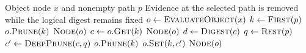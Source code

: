 \begin{algorithm}[htbp]
\caption{Deep Prune Along Object Path}
\label{alg:deep-prune}
\begin{algorithmic}[1]
\Require Object node $x$ and nonempty path $p$
\Ensure Evidence at the selected path is removed while the logical digest remains fixed
  \State $o \gets \Call{EvaluateObject}{x}$
  \State $k \gets \Call{First}{p}$
    \State $o.\Call{Prune}{k}$
    \State \Return $\Call{Node}{o}$
  \EndIf
  \State $c \gets o.\Call{Get}{k}$
    \State \Return $\Call{Node}{o}$
  \EndIf
  \State $d \gets \Call{Digest}{c}$
  \State $q \gets \Call{Rest}{p}$
  \State $c' \gets \Call{DeepPrune}{c,q}$
    \State {}
  \EndIf
    \State $o.\Call{Prune}{k}$
  \Else
    \State $o.\Call{Set}{k,c'}$
  \EndIf
  \State \Return $\Call{Node}{o}$
\EndFunction
\end{algorithmic}
\end{algorithm}
